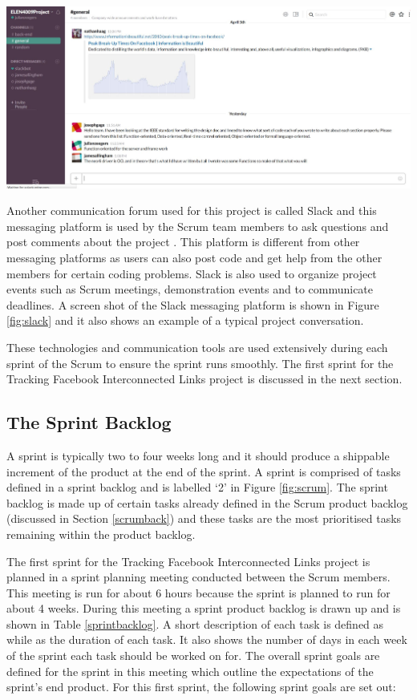 \documentclass[12pt,onecolumn]{article}
\begin{document}
	\begin{center}
		\includegraphics[width=\textwidth]{slick}
		 \label{fig:slack}
	\end{center}
	
	Another communication forum used for this project is called Slack and this messaging platform is used by the Scrum team members to ask questions and post comments about the project \cite{slack}. This platform is different from other messaging platforms as users can also post code and get help from the other members for certain coding problems. Slack is also used to organize project events such as Scrum meetings, demonstration events and to communicate deadlines. A screen shot of the Slack messaging platform is shown in Figure \ref{fig:slack} and it also shows an example of a typical project conversation.
	
	These technologies and communication tools are used extensively during each sprint of the Scrum to ensure the sprint runs smoothly. The first sprint for the Tracking Facebook Interconnected Links project is discussed in the next section. 
	
	
	\subsection{The Sprint Backlog } \label{sprintback}
	 A sprint is typically two to four weeks long and it should produce a shippable increment of the product at the end of the sprint. A sprint is comprised of tasks defined in a sprint backlog and is labelled `2' in Figure \ref{fig:scrum}. The sprint backlog is made up of certain tasks already defined in the Scrum product backlog (discussed in Section \ref{scrumback}) and these tasks are the most prioritised tasks remaining within the product backlog. 
	
	The first sprint for the Tracking Facebook Interconnected Links project is planned in a sprint planning meeting conducted between the Scrum members. This meeting is run for about 6 hours because the sprint is planned to run for about 4 weeks. During this meeting a sprint product backlog is drawn up and is shown in Table \ref{sprintbacklog}. A short description of each task is defined as while as the duration of each task. It also shows the number of days in each week of the sprint each task should be worked on for. The overall sprint goals are defined for the sprint in this meeting which outline the expectations of the sprint's end product. For this first sprint, the following sprint goals are set out:
	
\end{document}
